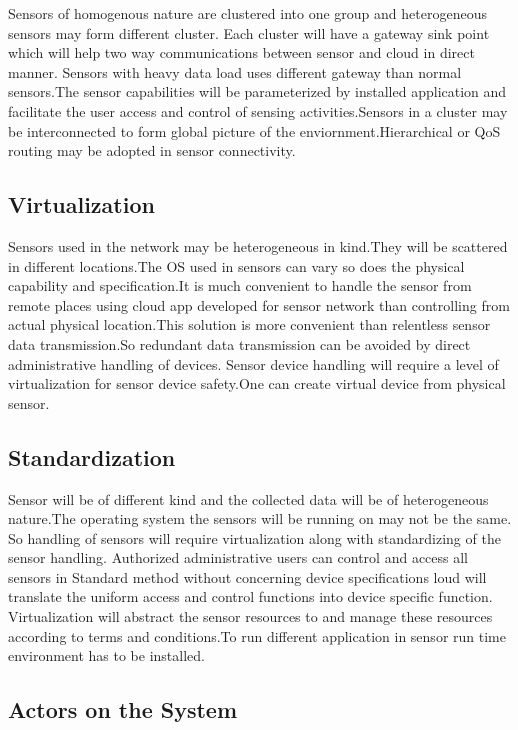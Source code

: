 \documentclass {report}
\begin{document}
Sensors of homogenous nature are clustered into one group and heterogeneous sensors may form different cluster. Each cluster will have a gateway sink point which will help two way communications between sensor and cloud in direct manner. Sensors with heavy data load uses different gateway than normal sensors.The sensor capabilities will be parameterized by installed application and facilitate the user access and control of sensing activities.Sensors in a cluster may be interconnected to form global picture of the 
enviornment.Hierarchical or QoS routing may be adopted in sensor connectivity.\\

\subsection{Virtualization}
Sensors used in the network may be heterogeneous in kind.They will be scattered in different locations.The OS used in sensors can vary so does the physical capability and specification.It is much convenient to handle the sensor from remote places using cloud app developed for sensor network than controlling from actual physical location.This solution is more convenient than relentless sensor data transmission.So redundant data transmission can be avoided by direct administrative handling of devices. Sensor device handling will require a level of virtualization for sensor device safety.One can create virtual device from physical sensor.\\

\subsection{Standardization }

Sensor will be of different kind and the collected data will be of heterogeneous nature.The operating system the sensors will be running on may not be the same. So handling of sensors will require virtualization along with standardizing of the sensor handling. Authorized administrative users can control and access all sensors in Standard method without concerning device specifications loud will translate the uniform access and control functions into device specific function.
Virtualization will abstract the sensor resources to and manage these resources according to terms and conditions.To run different application in sensor run time environment has to be installed.\\


\subsection{Actors on the System}
\end{document}

